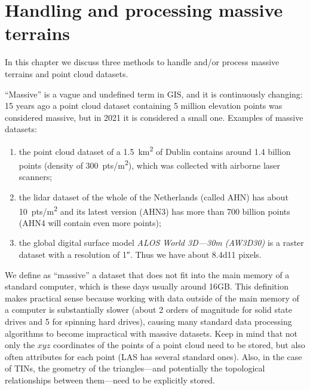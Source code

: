 
\setchapterpreamble[u]{\margintoc}

\chapter{Handling and processing massive terrains}%
\label{chap:massive}


\graphicspath{{massive/}}


In this chapter we discuss three methods to handle and/or process {\LARGE massive} terrains and point cloud datasets.

%

``Massive'' is a vague and undefined term in GIS, and it is continuously changing: 15 years ago a point cloud dataset containing 5 million elevation points was considered massive, but in 2021 it is considered a small one.%
Examples of massive datasets: 
\begin{enumerate}
  \item the point cloud dataset of a \SI{1.5}{km^2} of Dublin contains around 1.4 billion points (density of \SI{300}{pts/m^2}), which was collected with airborne laser scanners; 
  \item the lidar dataset of the whole of the Netherlands (called AHN) has about \SI{10}{pts/m^2} and its latest version (AHN3) has more than 700 billion points (AHN4 will contain even more points);
  \item the global digital surface model \emph{ALOS World 3D---30m (AW3D30)} is a raster dataset with a resolution of \ang{;;1}. Thus we have about \num{8.4d11} pixels.
\end{enumerate}

%

We define as ``massive'' a dataset that does not fit into the main memory of a standard computer, which is these days usually around 16GB\@.
This definition makes practical sense because working with data outside of the main memory of a computer is substantially slower (about 2 orders of magnitude for solid state drives and 5 for spinning hard drives), causing many standard data processing algorithms to become impractical with massive datasets.
Keep in mind that not only the $xyz$ coordinates of the points of a point cloud need to be stored, but also often attributes for each point (LAS has several standard ones).
Also, in the case of TINs, the geometry of the triangles---and potentially the topological relationships between them---need to be explicitly stored.


